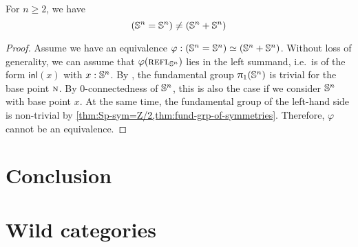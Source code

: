 \documentclass[english,a4paper]{lmcs}
\begin{document}
\begin{prop}\label{prop:not-generalising}
	For $n \geq 2$, we have
	\begin{equation}
	({\mathbb S^{n}} = {\mathbb S^{n}}) \not= ({\mathbb S^{n}} + {\mathbb S^{n}})
	\end{equation}
\end{prop}
\begin{proof}
	Assume we have an equivalence $\varphi : ({\mathbb S^{n}} = {\mathbb S^{n}}) \simeq ({\mathbb S^{n}} + {\mathbb S^{n}})$.
	Without loss of generality, we can assume that $\varphi(\mathop{{\textsc{refl}}_{{\mathbb S^{n}}}})$ lies in the left summand,
	i.e.\ is of the form $\mathsf{inl}(x)$ with $x : {\mathbb S^{n}}$.
	By \cite{HoTT}, the fundamental group $\uppi_{1}({\mathbb S^{n}})$ is trivial for the base point $\textsc{n}$. By $0$-connectedness of ${\mathbb S^{n}}$, this is also the case if we consider ${\mathbb S^{n}}$ with base point $x$.
	At the same time, the fundamental group of the left-hand side is non-trivial by
	\cref{thm:Sp-sym=Z/2,thm:fund-grp-of-symmetries}.
	Therefore, $\varphi$ cannot be an equivalence.
\end{proof}

\section{Conclusion}






\appendix
\section{Wild categories}
%
\end{document}
